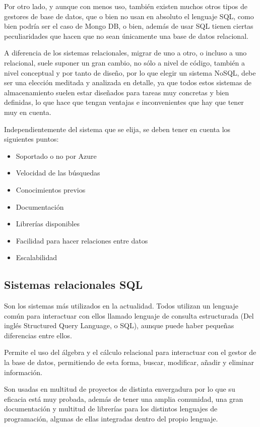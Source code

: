 Por otro lado, y aunque con menos uso, también existen muchos otros tipos de gestores de base de datos, que o bien no usan en absoluto el lenguaje SQL, como bien podría ser el caso de Mongo DB\cite{MongoDB}, o bien, además de usar SQL tienen ciertas peculiaridades que hacen que no sean únicamente una base de datos relacional. 

A diferencia de los sistemas relacionales, migrar de uno a otro, o incluso a uno relacional, suele suponer un gran cambio, no sólo a nivel de código, también a nivel conceptual y por tanto de diseño, por lo que elegir un sistema NoSQL, debe ser una elección meditada y analizada en detalle, ya que todos estos sistemas de almacenamiento suelen estar diseñados para tareas muy concretas y bien definidas, lo que hace que tengan ventajas e inconvenientes que hay que tener muy en cuenta.

Independientemente del sistema que se elija, se deben tener en cuenta los siguientes puntos:

\begin{itemize}
    \item Soportado o no por Azure
    \item Velocidad de las búsquedas
    \item Conocimientos previos
    \item Documentación
    \item Librerías disponibles 
    \item Facilidad para hacer relaciones entre datos
    \item Escalabilidad
\end{itemize}

\subsection{Sistemas relacionales SQL}

Son los sistemas más utilizados en la actualidad. Todos utilizan un lenguaje común para interactuar con ellos llamado lenguaje de consulta estructurada (Del inglés Structured Query Language, o SQL), aunque puede haber pequeñas diferencias entre ellos. 

Permite el uso del álgebra y el cálculo relacional para interactuar con el gestor de la base de datos, permitiendo de esta forma, buscar, modificar, añadir y eliminar información. 

Son usadas en multitud de proyectos de distinta envergadura por lo que su eficacia está muy probada, además de tener una amplia comunidad, una gran documentación y multitud de librerías para los distintos lenguajes de programación, algunas de ellas integradas dentro del propio lenguaje. 

